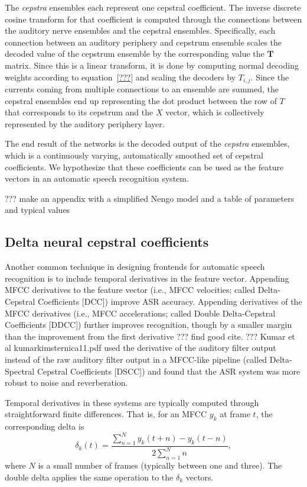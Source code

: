 The \textit{cepstra} ensembles
each represent one cepstral coefficient.
The inverse discrete cosine transform
for that coefficient is computed
through the connections between
the auditory nerve ensembles
and the cepstral ensembles.
Specifically, each connection
between an auditory periphery
and cepstrum ensemble
scales the decoded value of the
cepstrum ensemble by
the corresponding value
the $\mathbf{T}$ matrix.
Since this is a linear transform,
it is done by computing
normal decoding weights
according to equation~\eqref{???}
and scaling the decoders by $T_{i,j}$.
Since the currents coming from
multiple connections to an ensemble
are summed, the cepstral ensembles
end up representing the
dot product between the row of
$T$ that corresponds to its cepstrum
and the $X$ vector,
which is collectively represented
by the auditory periphery layer.

The end result of the networks
is the decoded output
of the \textit{cepstra} ensembles,
which is a continuously varying,
automatically smoothed set of cepstral coefficients.
We hypothesize that these coefficients can be used
as the feature vectors in an
automatic speech recognition system.

??? make an appendix with a simplified Nengo model
and a table of parameters and typical values

\subsection{Delta neural cepstral coefficients}

Another common technique in designing frontends
for automatic speech recognition is to
include temporal derivatives
in the feature vector.
Appending MFCC derivatives
to the feature vector
(i.e., MFCC velocities;
called Delta-Cepstral Coefficients [DCC])
improve ASR accuracy.
Appending derivatives of the MFCC derivatives
(i.e., MFCC accelerations;
called Double Delta-Cepstral Coefficients [DDCC])
further improves recognition,
though by a smaller margin than
the improvement from the first derivative
??? find good cite.
??? Kumar et al kumarkimsternica11.pdf
used the derivative of the auditory filter output
instead of the raw auditory filter output
in a MFCC-like pipeline
(called Delta-Spectral Cepstral Coefficients [DSCC])
and found that the ASR system
was more robust to noise and reverberation.

Temporal derivatives in these systems
are typically computed through straightforward
finite differences.
That is, for an MFCC $y_k$
at frame $t$, the corresponding delta is
\begin{equation}
  \label{dcc}
  \delta_k(t) = \frac{\sum_{n=1}^N y_k(t+n) - y_k(t-n)}{
    2 \sum_{n=1}^N n},
\end{equation}
where $N$ is a small number of frames
(typically between one and three).
The double delta applies the same operation
to the $\delta_k$ vectors.


